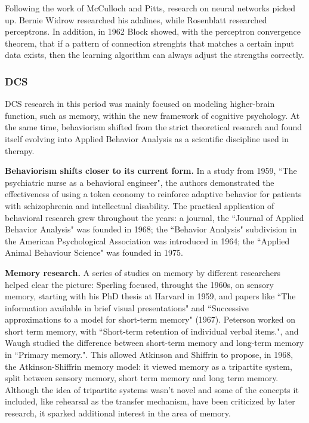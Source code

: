 \documentclass[../main.tex]{subfiles}
\begin{document}
Following the work of McCulloch and Pitts, research on neural networks picked up. Bernie Widrow researched his adalines\cite{widrowAssociativeStorageRetrieval1962}, while Rosenblatt researched perceptrons. In addition, in 1962 Block showed, with the perceptron convergence theorem, that if a pattern of connection strenghts that matches a certain input data exists, then the learning algorithm can always adjust the strengths correctly\cite{russellArtificialIntelligenceModern2002}.

\subsubsection{DCS}
DCS research in this period was mainly focused on modeling higher-brain function, such as memory, within the new framework of cognitive psychology. At the same time, behaviorism shifted from the strict theoretical research and found itself evolving into Applied Behavior Analysis as a scientific discipline used in therapy.

\vspace{4pt}
\textbf{Behaviorism shifts closer to its current form.}
In a study from 1959, ``The psychiatric nurse as a behavioral engineer"\cite{ayllonPsychiatricNurseBehavioral1959}, the authors demonstrated the effectiveness of using a token economy to reinforce adaptive behavior for patients with schizophrenia and intellectual disability. The practical application of behavioral research grew throughout the years: a journal, the ``Journal of Applied Behavior Analysis" was founded in 1968; the ``Behavior Analysis" subdivision in the American Psychological Association was introduced in 1964; the ``Applied Animal Behaviour Science" was founded in 1975.

\vspace{4pt}
\textbf{Memory research.}
A series of studies on memory by different researchers helped clear the picture: Sperling focused, throught the 1960s, on sensory memory, starting with his PhD thesis at Harvard in 1959, and papers like ``The information available in brief visual presentations"\cite{sperlingInformationAvailableBrief1960} and ``Successive approximations to a model for short-term memory" (1967). Peterson worked on short term memory, with ``Short-term retention of individual verbal items."\cite{petersonShorttermRetentionIndividual1959}, and Waugh studied the difference between short-term memory and long-term memory in ``Primary memory."\cite{waughPrimaryMemory1965}. This allowed Atkinson and Shiffrin to propose, in 1968, the Atkinson-Shiffrin memory model: it viewed memory as a tripartite system, split between sensory memory, short term memory and long term memory. Although the idea of tripartite systems wasn't novel \cite{jamesPrinciplesPsychology1890} and some of the concepts it included, like rehearsal as the transfer mechanism, have been criticized by later research, it sparked additional interest in the area of memory.
\end{document}
